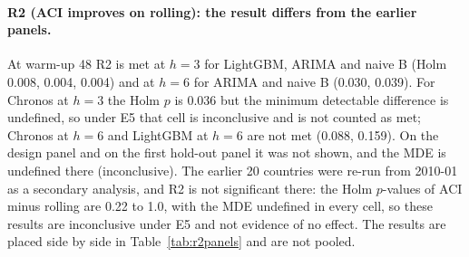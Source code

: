 \paragraph{R2 (ACI improves on rolling): the result differs from the earlier panels.} At warm-up 48 R2 is met at $h=3$ for LightGBM, ARIMA and naive B (Holm 0.008, 0.004, 0.004) and at $h=6$ for ARIMA and naive B (0.030, 0.039). For Chronos at $h=3$ the Holm $p$ is 0.036 but the minimum detectable difference is undefined, so under E5 that cell is inconclusive and is not counted as met; Chronos at $h=6$ and LightGBM at $h=6$ are not met (0.088, 0.159). On the design panel and on the first hold-out panel it was not shown, and the MDE is undefined there (inconclusive). The earlier 20 countries were re-run from 2010-01 as a secondary analysis, and R2 is not significant there: the Holm $p$-values of ACI minus rolling are 0.22 to 1.0, with the MDE undefined in every cell, so these results are inconclusive under E5 and not evidence of no effect. The results are placed side by side in Table~\ref{tab:r2panels} and are not pooled.

